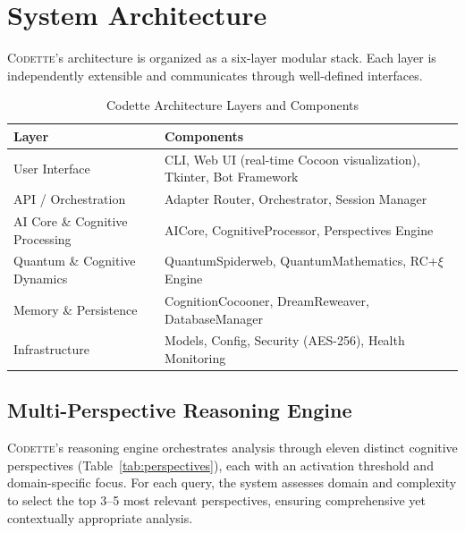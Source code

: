 \documentclass[11pt,a4paper]{article}
\newcommand{\rcxi}{RC+$\xi$}
\newcommand{\codette}{\textsc{Codette}}
\begin{document}
\section{System Architecture}
\label{sec:architecture}

\codette{}'s architecture is organized as a six-layer modular stack. Each layer is independently extensible and communicates through well-defined interfaces.

\begin{table}[H]
\centering
\caption{Codette Architecture Layers and Components}
\label{tab:architecture}
\begin{tabular}{@{}p{3.5cm}p{9cm}@{}}
\toprule
\textbf{Layer} & \textbf{Components} \\
\midrule
User Interface & CLI, Web UI (real-time Cocoon visualization), Tkinter, Bot Framework \\
API / Orchestration & Adapter Router, Orchestrator, Session Manager \\
AI Core \& Cognitive Processing & AICore, CognitiveProcessor, Perspectives Engine \\
Quantum \& Cognitive Dynamics & QuantumSpiderweb, QuantumMathematics, \rcxi{} Engine \\
Memory \& Persistence & CognitionCocooner, DreamReweaver, DatabaseManager \\
Infrastructure & Models, Config, Security (AES-256), Health Monitoring \\
\bottomrule
\end{tabular}
\end{table}

\subsection{Multi-Perspective Reasoning Engine}
\codette{}'s reasoning engine orchestrates analysis through eleven distinct cognitive perspectives (Table~\ref{tab:perspectives}), each with an activation threshold and domain-specific focus. For each query, the system assesses domain and complexity to select the top 3--5 most relevant perspectives, ensuring comprehensive yet contextually appropriate analysis.
\end{document}
